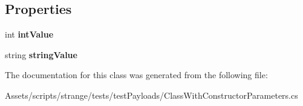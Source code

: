 \subsection*{Properties}
\begin{DoxyCompactItemize}
\item 
\hypertarget{classstrange_1_1unittests_1_1_class_with_constructor_parameters_a15c62fe846fbd64aa2fde9f68ec3b90e}{int {\bfseries int\-Value}}\label{classstrange_1_1unittests_1_1_class_with_constructor_parameters_a15c62fe846fbd64aa2fde9f68ec3b90e}

\item 
\hypertarget{classstrange_1_1unittests_1_1_class_with_constructor_parameters_a5fc095a82e91bb7948ffa13f9965f48b}{string {\bfseries string\-Value}}\label{classstrange_1_1unittests_1_1_class_with_constructor_parameters_a5fc095a82e91bb7948ffa13f9965f48b}

\end{DoxyCompactItemize}


The documentation for this class was generated from the following file\-:\begin{DoxyCompactItemize}
\item 
Assets/scripts/strange/tests/test\-Payloads/Class\-With\-Constructor\-Parameters.\-cs\end{DoxyCompactItemize}
